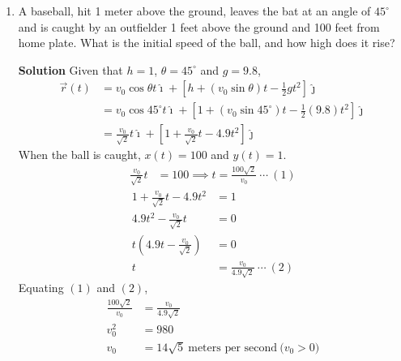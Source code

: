 \documentclass{report}
\begin{document}
\begin{enumerate}
          \newpage
    \item A baseball, hit 1 meter above the ground, leaves the bat at an angle of
          $45^{\circ}$ and is caught by an outfielder 1 feet above the ground and 100
          feet from home plate. What is the initial speed of the ball, and how high does
          it rise?

          \textbf{Solution} Given that $h = 1$, $\theta = 45^{\circ}$ and $g = 9.8$,
          \begin{align*}
              \vec{r}(t) & = v_0\cos\theta t\hat{\imath} + \left[h + (v_0\sin\theta) t - \frac{1}{2}gt^2\right]\hat{\jmath}                 \\
                         & = v_0\cos{45^{\circ}} t\hat{\imath} + \left[1 + (v_0\sin{45^{\circ}}) t - \frac{1}{2}(9.8)t^2\right]\hat{\jmath} \\
                         & = \frac{v_0}{\sqrt{2}} t\hat{\imath} + \left[1 + \frac{v_0}{\sqrt{2}} t - 4.9t^2\right]\hat{\jmath}
          \end{align*}
          When the ball is caught, $x(t) = 100$ and $y(t) = 1$.
          \begin{align*}
              \frac{v_0}{\sqrt{2}} t & = 100 \implies t = \frac{100\sqrt{2}}{v_0}\ \cdots\ (1)
          \end{align*}
          \vspace{-2.4em}
          \begin{align*}
              1 + \frac{v_0}{\sqrt{2}} t - 4.9t^2 & = 1                                     \\
              4.9t^2 - \frac{v_0}{\sqrt{2}} t     & = 0                                     \\
              t(4.9t - \frac{v_0}{\sqrt{2}})      & = 0                                     \\
              t                                   & = \frac{v_0}{4.9\sqrt{2}} \ \cdots\ (2)
          \end{align*}
          Equating $(1)$ and $(2)$,
          \begin{align*}
              \frac{100\sqrt{2}}{v_0} & = \frac{v_0}{4.9\sqrt{2}}                                  \\
              v_0^2                   & = 980                                                      \\
              v_0                     & = 14\sqrt{5}\ \text{meters per second}\ \text{($v_0 > 0$)}
          \end{align*}

\end{enumerate}
\end{document}
